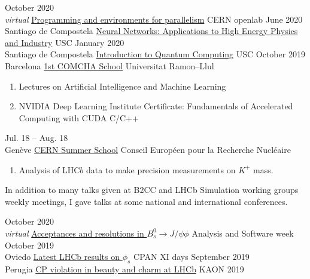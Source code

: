 \documentclass[9pt]{resumetemplate}
\begin{document}

\begin{entrylist}
  \entry
	  {October 2020\\\footnotesize{\emph{virtual}}}
		{\href{https://indico.cern.ch/event/865287/}{Programming and environments
		for parallelism}}
		{CERN openlab}
		{}
  \entry
	  {June 2020\\\footnotesize{Santiago de Compostela}}
		{\href{https://indico.cern.ch/event/865287/}{Neural Networks: Applications
		to High Energy Physics and Industry}}
		{USC}
		{}
  \entry
	  {January 2020\\\footnotesize{Santiago de Compostela}}
		{\href{https://indico.cern.ch/event/865287/}{Introduction to Quantum
		Computing}}
		{USC}
		{}
  \entry
	  {October 2019\\\footnotesize{Barcelona}}
		{\href{https://indico.ific.uv.es/event/3825/}{1st COMCHA School}}
		{Universitat Ramon--Llul}
		{%
		\vspace{-3mm}
    \begin{enumerate}
      \item Lectures on Artificial Intelligence and Machine Learning
      \item NVIDIA Deep Learning Institute Certificate: Fundamentals of
			Accelerated Computing with CUDA C/C++
    \end{enumerate}
    }
  \entry
	  {Jul. 18 -- Aug. 18\\\footnotesize{Genève}}
		{\href{https://home.cern/summer-student-programme}{CERN Summer School}}
		{Conseil Européen pour la Recherche Nucléaire}
		{%
		\vspace{-3mm}
    \begin{enumerate}
      \item Analysis of LHC$b$ data to make precision measurements on ${K^+}$
			mass.
    \end{enumerate}
    }
\end{entrylist}

In addition to many talks given at B2CC and LHCb Simulation working groups
weekly meetings, I gave talks at some national and international
conferences.\\[3mm]

\begin{entrylist}
  \entry
	  {October 2020\\\footnotesize{\emph{virtual}}}
		{\href{https://indico.ific.uv.es/event/3825/}{Acceptances and resolutions in
		$B_s^0 \rightarrow J/\!\psi \phi$}}
		{Analysis and Software week}{}
  \entry
	  {October 2019\\\footnotesize{Oviedo}}
		{\href{https://indico.ific.uv.es/event/3825/}{Latest LHCb results on
		$\phi_s$}}
		{CPAN XI days}{}
  \entry
	  {September 2019\\\footnotesize{Perugia}}
		{\href{https://indico.ific.uv.es/event/3825/}{CP violation in beauty and
		charm at LHCb}}
		{KAON 2019}{}
\end{entrylist}
\end{document}
